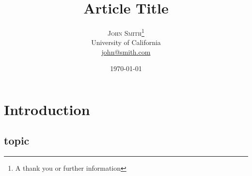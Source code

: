 \documentclass[twoside,twocolumn]{article}
\title{Article Title} %
\author{%
\textsc{John Smith}\thanks{A thank you or further information} \\[1ex] %
\normalsize University of California \\ %
\normalsize \href{mailto:john@smith.com}{john@smith.com} %
}
\date{\today} %
\begin{document}
\maketitle


\section{Introduction}


\subsection{topic}
\end{document}
